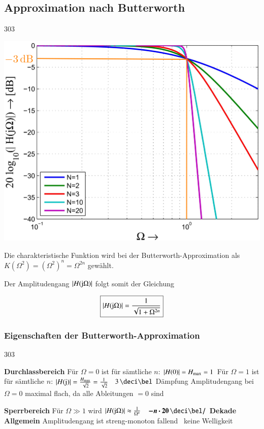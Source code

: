 \subsection{Approximation nach Butterworth}{303}

\begin{minipage}[c]{0.45\columnwidth}
    \includegraphics[width=\columnwidth]{images/filter_butterworth_amplitudengang.png}
\end{minipage}
\hfill
\begin{minipage}[c]{0.48\columnwidth}
    Die charakteristische Funktion wird bei der Butterworth-Approximation als\\
    $K(\Omega^2) = (\Omega^2)^n = \Omega^{2n}$ gewählt.

    Der Amplitudengang $|H(\mathrm{j} \Omega)|$ folgt somit der Gleichung

    $$\boxed{ |H(\mathrm{j} \Omega)| = \frac{1}{\sqrt{ 1 +\Omega^{2n}}} } $$
\end{minipage}


\subsubsection{Eigenschaften der Butterworth-Approximation}{303}

\begin{outline}
    \1 \textbf{Durchlassbereich}
        \2 Für $\Omega = 0$ ist für sämtliche $n$: $|H(0)| = H_{\rm max} = 1$
        \2 Für $\Omega = 1$ ist für sämtliche $n$: $|H(\mathrm{j})| = \frac{H_{\rm max}}{\sqrt{2}} = \frac{1}{\sqrt{2}}$
            \textrightarrow\ $3 \, \deci \bel$ Dämpfung
        \2 Amplitudengang bei $\Omega = 0$ maximal flach, da alle Ableitungen $=0$ sind

    \1 \textbf{Sperrbereich}
        \2 Für $\Omega \gg 1$ wird $|H(\mathrm{j} \Omega)| \approx \frac{1}{\Omega^n}$ 
            \textrightarrow\ $\bm{- n \cdot 20 \, \deci \bel /}$ \textbf{Dekade}
    \1 \textbf{Allgemein}
        \2 Amplitudengang ist streng-monoton fallend \textrightarrow\ keine Welligkeit
\end{outline}


